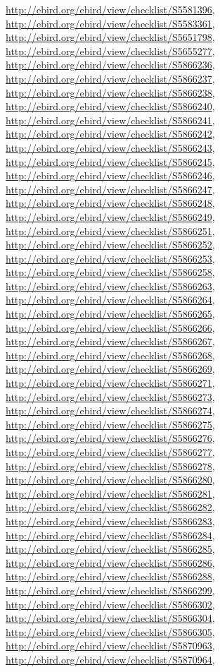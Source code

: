 \documentclass[9pt, article]{memoir}
\begin{document}
\begin{multicols}{2}
\url{http://ebird.org/ebird/view/checklist/S5581396}, 
\url{http://ebird.org/ebird/view/checklist/S5583361}, 
\url{http://ebird.org/ebird/view/checklist/S5651798}, 
\url{http://ebird.org/ebird/view/checklist/S5655277}, 
\url{http://ebird.org/ebird/view/checklist/S5866236}, 
\url{http://ebird.org/ebird/view/checklist/S5866237}, 
\url{http://ebird.org/ebird/view/checklist/S5866238}, 
\url{http://ebird.org/ebird/view/checklist/S5866240}, 
\url{http://ebird.org/ebird/view/checklist/S5866241}, 
\url{http://ebird.org/ebird/view/checklist/S5866242}, 
\url{http://ebird.org/ebird/view/checklist/S5866243}, 
\url{http://ebird.org/ebird/view/checklist/S5866245}, 
\url{http://ebird.org/ebird/view/checklist/S5866246}, 
\url{http://ebird.org/ebird/view/checklist/S5866247}, 
\url{http://ebird.org/ebird/view/checklist/S5866248}, 
\url{http://ebird.org/ebird/view/checklist/S5866249}, 
\url{http://ebird.org/ebird/view/checklist/S5866251}, 
\url{http://ebird.org/ebird/view/checklist/S5866252}, 
\url{http://ebird.org/ebird/view/checklist/S5866253}, 
\url{http://ebird.org/ebird/view/checklist/S5866258}, 
\url{http://ebird.org/ebird/view/checklist/S5866263}, 
\url{http://ebird.org/ebird/view/checklist/S5866264}, 
\url{http://ebird.org/ebird/view/checklist/S5866265}, 
\url{http://ebird.org/ebird/view/checklist/S5866266}, 
\url{http://ebird.org/ebird/view/checklist/S5866267}, 
\url{http://ebird.org/ebird/view/checklist/S5866268}, 
\url{http://ebird.org/ebird/view/checklist/S5866269}, 
\url{http://ebird.org/ebird/view/checklist/S5866271}, 
\url{http://ebird.org/ebird/view/checklist/S5866273}, 
\url{http://ebird.org/ebird/view/checklist/S5866274}, 
\url{http://ebird.org/ebird/view/checklist/S5866275}, 
\url{http://ebird.org/ebird/view/checklist/S5866276}, 
\url{http://ebird.org/ebird/view/checklist/S5866277}, 
\url{http://ebird.org/ebird/view/checklist/S5866278}, 
\url{http://ebird.org/ebird/view/checklist/S5866280}, 
\url{http://ebird.org/ebird/view/checklist/S5866281}, 
\url{http://ebird.org/ebird/view/checklist/S5866282}, 
\url{http://ebird.org/ebird/view/checklist/S5866283}, 
\url{http://ebird.org/ebird/view/checklist/S5866284}, 
\url{http://ebird.org/ebird/view/checklist/S5866285}, 
\url{http://ebird.org/ebird/view/checklist/S5866286}, 
\url{http://ebird.org/ebird/view/checklist/S5866288}, 
\url{http://ebird.org/ebird/view/checklist/S5866299}, 
\url{http://ebird.org/ebird/view/checklist/S5866302}, 
\url{http://ebird.org/ebird/view/checklist/S5866304}, 
\url{http://ebird.org/ebird/view/checklist/S5866305}, 
\url{http://ebird.org/ebird/view/checklist/S5870963}, 
\url{http://ebird.org/ebird/view/checklist/S5870964}, 

\end{multicols}
\end{document}
